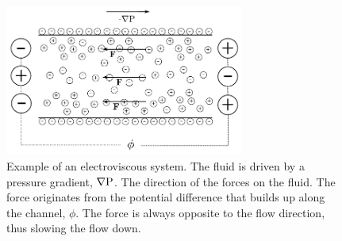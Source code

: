 \begin{figure}
\begin{center}
\includegraphics[width=0.7\textwidth]{fig/channel_electroviscous.pdf}
\end{center}
\caption{Example of an electroviscous system. The fluid is driven by a
  pressure gradient, $\nabla \mathrm{P}$. The direction of the forces on the
  fluid. The force originates from the potential difference that
  builds up along the channel, $\phi$. The force is always opposite to
  the flow direction, thus slowing the flow down.}
\label{fig:et:ev}
\end{figure}
